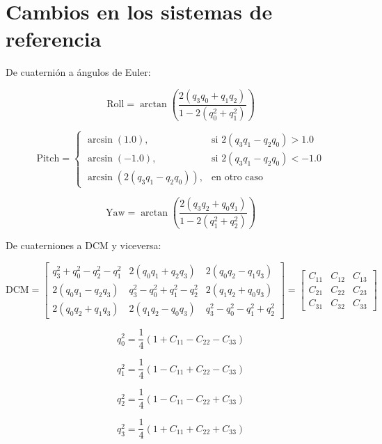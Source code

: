 \section{Cambios en los sistemas de referencia}

\label{ap:Z3}

De cuaternión a ángulos de Euler:

\[
\text{Roll} = \arctan \left( \frac{2(q_3 q_0 + q_1 q_2)}{1 - 2(q_0^2 + q_1^2)} \right)
\]

\[
\text{Pitch} =
\begin{cases} 
	\arcsin(1.0), & \text{si } 2(q_3 q_1 - q_2 q_0) > 1.0 \\
	\arcsin(-1.0), & \text{si } 2(q_3 q_1 - q_2 q_0) < -1.0 \\
	\arcsin(2(q_3 q_1 - q_2 q_0)), & \text{en otro caso}
\end{cases}
\]

\[
\text{Yaw} = \arctan \left( \frac{2(q_3 q_2 + q_0 q_1)}{1 - 2(q_1^2 + q_2^2)} \right)
\]

De cuaterniones a DCM y viceversa:

\[
\text{DCM} = \begin{bmatrix}
	q_3^2 + q_0^2 - q_2^2 - q_1^2 & 2(q_0 q_1 + q_2 q_3) & 2(q_0 q_2 - q_1 q_3) \\
	2(q_0 q_1 - q_2 q_3) & q_3^2 - q_0^2 + q_1^2 - q_2^2 & 2(q_1 q_2 + q_0 q_3) \\
	2(q_0 q_2 + q_1 q_3) & 2(q_1 q_2 - q_0 q_3) & q_3^2 - q_0^2 - q_1^2 + q_2^2
\end{bmatrix}
= \begin{bmatrix}
	C_{11} & C_{12} & C_{13} \\
	C_{21} & C_{22} & C_{23} \\
	C_{31} & C_{32} & C_{33}
\end{bmatrix}
\]

\[
q_0^2 = \frac{1}{4}(1 + C_{11} - C_{22} - C_{33})
\]

\[
q_1^2 = \frac{1}{4}(1 - C_{11} + C_{22} - C_{33})
\]

\[
q_2^2 = \frac{1}{4}(1 - C_{11} - C_{22} + C_{33})
\]

\[
q_3^2 = \frac{1}{4}(1 + C_{11} + C_{22} + C_{33})
\]


